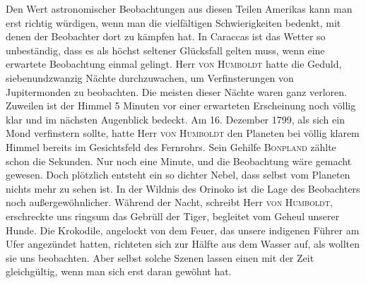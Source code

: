 Den Wert astronomischer Beobachtungen aus diesen Teilen Amerikas kann man erst richtig würdigen, wenn man die vielfältigen Schwierigkeiten bedenkt, mit denen der Beobachter dort zu kämpfen hat. In Caraccas ist das Wetter so unbeständig, dass es als höchst seltener Glücksfall gelten muss, wenn eine erwartete Beobachtung einmal gelingt. Herr \textsc{von Humboldt} hatte die Geduld, siebenundzwanzig Nächte durchzuwachen, um Verfinsterungen von Jupitermonden zu beobachten. Die meisten dieser Nächte waren ganz verloren. Zuweilen ist der Himmel 5 Minuten vor einer erwarteten Erscheinung noch völlig klar und im nächsten Augenblick bedeckt. Am 16. Dezember 1799, als sich ein Mond verfinstern sollte, hatte Herr \textsc{von Humboldt} den Planeten bei völlig klarem Himmel bereits im Gesichtsfeld des Fernrohrs. Sein Gehilfe \textsc{Bonpland} zählte schon die Sekunden. Nur noch eine Minute, und die Beobachtung wäre gemacht gewesen. Doch plötzlich entsteht ein so dichter Nebel, dass selbst vom Planeten nichts mehr zu sehen ist. In der Wildnis des Orinoko ist die Lage des Beobachters noch außergewöhnlicher. Während der Nacht, schreibt Herr \textsc{von Humboldt}, erschreckte uns ringsum das Gebrüll der Tiger, begleitet vom Geheul unserer Hunde. Die Krokodile, angelockt von dem Feuer, das unsere indigenen Führer am Ufer angezündet hatten, richteten sich zur Hälfte aus dem Wasser auf, als wollten sie uns beobachten. Aber selbst solche Szenen lassen einen mit der Zeit gleichgültig, wenn man sich erst daran gewöhnt hat.

